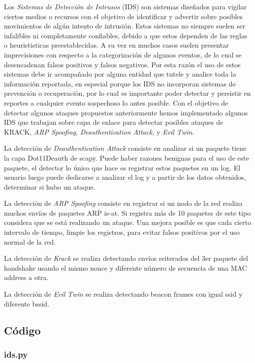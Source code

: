 \documentclass[10pt,a4paper]{article}
\begin{document}
Los \textit{Sistemas de Detección de Intrusos} (IDS) son sistemas diseñados para vigilar ciertos medios o recursos con el objetivo de identificar y advertir sobre posibles movimientos de algún intento de intrusión. Estos sistemas no siempre suelen ser infalibles ni completamente confiables, debido a que estos dependen de las reglas o heurististicas preestablecidas. A su vez en muchos casos suelen presentar imprecisiones con respecto a la categorización de algunos eventos, de lo cual se desencadenan falsos positivos y falsos negativos. Por esta razón el uso de estos sistemas debe ir acompañado por alguna entidad que tutele y analice toda la información reportada, en especial porque los IDS no incorporan sistemas de prevención o recuperación, por lo cual es importante poder detectar y persistir en reportes a cualquier evento sospechoso lo antes posible. 
Con el objetivo de detectar algunos ataques propuestos anteriormente hemos implementado algunos IDS que trabajan sobre capa de enlace para detectar posibles ataques de KRACK, \textit{ARP Spoofing}, \textit{Deauthentication Attack}, y \textit{Evil Twin}.
\newline

La detección de \textit{Deauthentication Attack} consiste en analizar si un paquete tiene la capa Dot11Deauth de scapy.
Puede haber razones benignas para el uso de este paquete, el detector lo único que hace es registrar estos paquetes en un log.
El usuario luego puede dedicarse a analizar el log y a partir de los datos obtenidos, determinar si hubo un ataque.


La detección de \textit{ARP Spoofing} consiste en registrar si un nodo de la red realiza muchos envíos de paquetes ARP is-at. Si registra más de 10 paquetes de este tipo considera que se está realizando un ataque. Una mejora posible es que cada cierto intervalo de tiempo, limpie los registros, para evitar falsos positivos por el uso normal de la red.

La detección de \textit{Krack} se realiza detectando envíos reiterados del 3er paquete del handshake usando el mismo nonce y diferente número de secuencia de una MAC address a otra.

La detección de \textit{Evil Twin} se realiza detectando beacon frames con igual ssid y diferente bssid.

\subsection{Código}

\subsubsection{ids.py}

\end{document}
